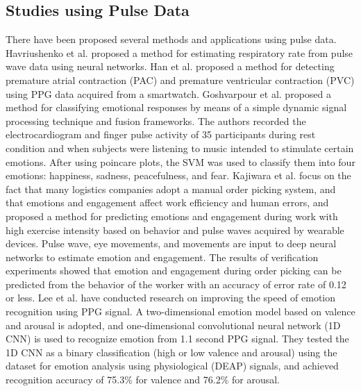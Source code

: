 \documentclass[sigchi,authordraft]{acmart}
\begin{document}
\subsection{Studies using Pulse Data}
There have been proposed several methods and applications using pulse data.
Havriushenko et al.\cite{respiratory_rate_estimation} proposed a method for estimating respiratory rate from pulse wave data using neural networks. %
Han et al.\cite{arrhythmia_detection} proposed a method for detecting premature atrial contraction (PAC) and premature ventricular contraction (PVC) using PPG data acquired from a smartwatch.
Goshvarpour et al.\cite{emotion_recognition_poincare} proposed a method for classifying emotional responses by means of a simple dynamic signal processing technique and fusion frameworks. The authors recorded the electrocardiogram and finger pulse activity of 35 participants during rest condition and when subjects were listening to music intended to stimulate certain emotions. After using poincare plots, the SVM was used to classify them into four emotions: happiness, sadness, peacefulness, and fear.
Kajiwara et al.\cite{pulse_order_picking} focus on the fact that many logistics companies adopt a manual order picking system, and that emotions and engagement affect work efficiency and human errors, and proposed a method for predicting emotions and engagement during work with high exercise intensity based on behavior and pulse waves acquired by wearable devices. Pulse wave, eye movements, and movements are input to deep neural networks to estimate emotion and engagement. The results of verification experiments showed that emotion and engagement during order picking can be predicted from the behavior of the worker with an accuracy of error rate of 0.12 or less.
Lee et al.\cite{fast_emotion_recognition} have conducted research on improving the speed of emotion recognition using PPG signal. A two-dimensional emotion model based on valence and arousal is adopted, and one-dimensional convolutional neural network (1D CNN) is used to recognize emotion from 1.1 second PPG signal. They tested the 1D CNN as a binary classification (high or low valence and arousal) using the dataset for emotion analysis using physiological (DEAP) signals, and achieved recognition accuracy of 75.3\% for valence and 76.2\% for arousal.\par
\end{document}
